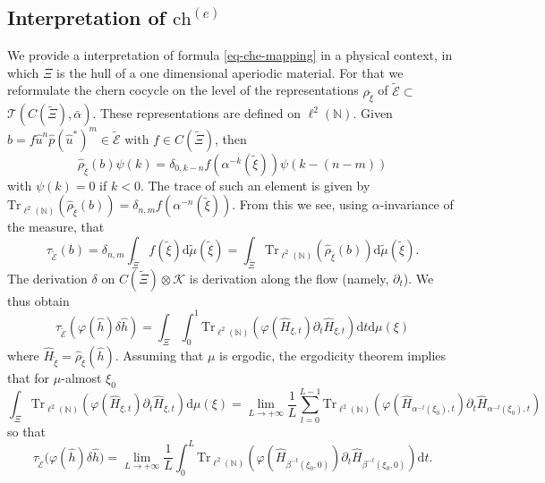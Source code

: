 \documentclass[11pt]{amsart}
\newcommand{\N}{\mathbb{N}}
\newcommand{\che}{\text{ch}^{(e)}}
\begin{document}
\subsection{Interpretation of $\che$}\label{sec-interpretation-mapping}
We provide a interpretation of formula \eqref{eq-che-mapping} in a physical context, in which $\Xi$ is the hull of a one dimensional aperiodic material. For that we reformulate the chern cocycle on the level of the representations $\hat\rho_{\tilde\xi}$ of 
$\tilde {\mathcal E} \subset $
$\mathcal{T}(C(\tilde\Xi), \bar{\alpha})$. These representations are defined on $\ell^2(\N)$. Given
$b = f \hat u^n\hat p (\hat{u}^*)^m\in \tilde {\mathcal E}$ with $f\in C(\tilde\Xi)$, then
$$\hat\rho_{\tilde\xi}(b) \psi (k) = \delta_{0,k-n} f(\alpha^{-k}(\tilde\xi)) \psi(k-(n-m))$$
with $\psi(k)=0$ if $k<0$. The trace of such an element is given by $\mathrm{Tr}_{\ell^2(\N)}(\hat\rho_{\tilde\xi}(b))=\delta_{n,m} f(\alpha^{-n} (\tilde\xi))$.
From this we see, using $\alpha$-invariance of the measure, that
\begin{equation}\label{eq-tau-m}
\tau_{\tilde{\mathcal  E}}(b) = \delta_{n,m}  \int_{\tilde\Xi }f(\tilde{\xi})\mathrm{d}\tilde \mu(\tilde{\xi}) =  \int_{\tilde \Xi} \mathrm{Tr}_{\ell^2(\N)}(\hat\rho_{\tilde\xi}(b)) \mathrm{d}\tilde\mu(\tilde\xi).
\end{equation}
The derivation $\delta$ on $C(\tilde \Xi)\otimes \mathcal K$ is derivation along the flow (namely, $\partial_t$).
We thus obtain 
\begin{equation}\label{eq-che-m}
\tau_{\tilde{\mathcal  E}}(\varphi(\hat h)\delta \hat h) = \int_{\Xi}\int_0^1   \mathrm{Tr}_{\ell^2(\N)}(\varphi(\hat H_{\xi,t})\partial_t \hat H_{\xi,t} ) \mathrm{d} t \mathrm{d}\mu(\xi)
\end{equation}
where $\hat H_{\tilde\xi}=\hat\rho_{\tilde\xi}(\hat h)$. 
Assuming that $\mu$ is ergodic, the ergodicity theorem implies that for $\mu$-almost $\xi_0$ 
\begin{equation*}
	\int_{\Xi}\mathrm{Tr}_{\ell^2(\N)}(\varphi(\hat{H}_{\xi,t})\partial_t \hat{H}_{\xi,t} ) \mathrm{d}\mu(\xi)
	=  \lim_{L\to +\infty} \frac1{L} \sum_{l=0}^{L-1} \mathrm{Tr}_{\ell^2(\N)}(\varphi(\hat{H}_{\alpha^{-l}(\xi_0),t})\partial_t \hat{H}_{\alpha^{-l}(\xi_0),t} )
\end{equation*}
so that
$$\tau_{\tilde{\mathcal  E}}\big( \varphi(\hat h)\delta \hat h\big)= \lim_{L\to +\infty} \frac1{L} \int_0^{L}   \mathrm{Tr}_{\ell^2(\N)}(\varphi(\hat{H}_{\beta^{-t}(\xi_0,0)})\partial_t \hat{H}_{\beta^{-t}(\xi_0,0)} ) \mathrm{d}t .$$
\end{document}
